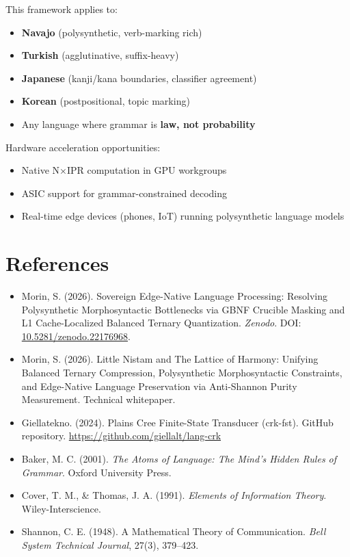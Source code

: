 \documentclass[11pt,oneside]{article}
\begin{document}
This framework applies to:
\begin{itemize}
  \item \textbf{Navajo} (polysynthetic, verb-marking rich)
  \item \textbf{Turkish} (agglutinative, suffix-heavy)
  \item \textbf{Japanese} (kanji/kana boundaries, classifier agreement)
  \item \textbf{Korean} (postpositional, topic marking)
  \item Any language where grammar is \textbf{law, not probability}
\end{itemize}

Hardware acceleration opportunities:
\begin{itemize}
  \item Native N×IPR computation in GPU workgroups
  \item ASIC support for grammar-constrained decoding
  \item Real-time edge devices (phones, IoT) running polysynthetic language models
\end{itemize}

\section*{References}

\begin{itemize}
  \item Morin, S. (2026). Sovereign Edge-Native Language Processing: Resolving Polysynthetic Morphosyntactic Bottlenecks via GBNF Crucible Masking and L1 Cache-Localized Balanced Ternary Quantization. \emph{Zenodo}. DOI: \href{https://doi.org/10.5281/zenodo.22176968}{10.5281/zenodo.22176968}.
  \item Morin, S. (2026). Little Nistam and The Lattice of Harmony: Unifying Balanced Ternary Compression, Polysynthetic Morphosyntactic Constraints, and Edge-Native Language Preservation via Anti-Shannon Purity Measurement. Technical whitepaper.
  \item Giellatekno. (2024). Plains Cree Finite-State Transducer (crk-fst). GitHub repository. \url{https://github.com/giellalt/lang-crk}
  \item Baker, M. C. (2001). \emph{The Atoms of Language: The Mind's Hidden Rules of Grammar}. Oxford University Press.
  \item Cover, T. M., \& Thomas, J. A. (1991). \emph{Elements of Information Theory}. Wiley-Interscience.
  \item Shannon, C. E. (1948). A Mathematical Theory of Communication. \emph{Bell System Technical Journal}, 27(3), 379--423.
\end{itemize}
\end{document}
